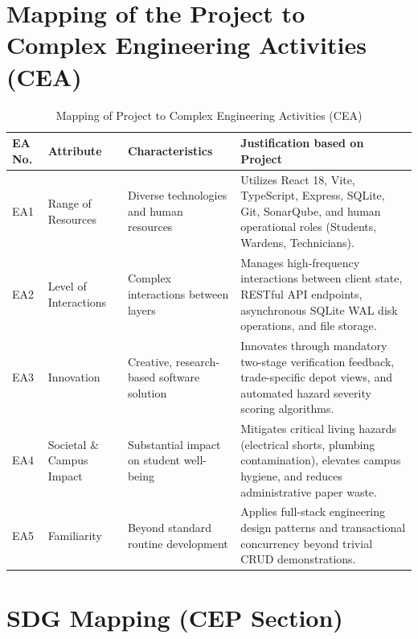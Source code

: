 \documentclass[10pt]{report}
\begin{document}
\section{Mapping of the Project to Complex Engineering Activities (CEA)}

\begin{table}[H]
\centering
\small
\renewcommand{\arraystretch}{1.3}
\begin{tabular}{|p{1.2cm}|p{3.0cm}|p{4.0cm}|p{6.5cm}|}
\hline
\textbf{EA No.} & \textbf{Attribute} & \textbf{Characteristics} & \textbf{Justification based on Project} \\
\hline
EA1 & Range of Resources & Diverse technologies and human resources & Utilizes React 18, Vite, TypeScript, Express, SQLite, Git, SonarQube, and human operational roles (Students, Wardens, Technicians). \\
\hline
EA2 & Level of Interactions & Complex interactions between layers & Manages high-frequency interactions between client state, RESTful API endpoints, asynchronous SQLite WAL disk operations, and file storage. \\
\hline
EA3 & Innovation & Creative, research-based software solution & Innovates through mandatory two-stage verification feedback, trade-specific depot views, and automated hazard severity scoring algorithms. \\
\hline
EA4 & Societal \& Campus Impact & Substantial impact on student well-being & Mitigates critical living hazards (electrical shorts, plumbing contamination), elevates campus hygiene, and reduces administrative paper waste. \\
\hline
EA5 & Familiarity & Beyond standard routine development & Applies full-stack engineering design patterns and transactional concurrency beyond trivial CRUD demonstrations. \\
\hline
\end{tabular}
\caption{Mapping of Project to Complex Engineering Activities (CEA)}
\end{table}

\section{SDG Mapping (CEP Section)}
\end{document}

